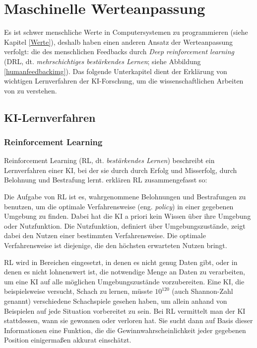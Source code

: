 \chapter{Maschinelle Werteanpassung}

Es ist schwer menschliche Werte in Computersystemen zu programmieren (siehe Kapitel \ref{Werte}), deshalb haben \citeauthor{irving_ai_2018} einen anderen Ansatz der Werteanpassung verfolgt: die des menschlichen Feedbacks durch \emph{Deep reinforcement learning} (DRL, dt. \emph{mehrschichtiges bestärkendes Lernen}; siehe Abbildung \ref{humanfeedbackimg}). Das folgende Unterkapitel dient der Erklärung von wichtigen Lernverfahren der KI-Forschung, um die wissenschaftlichen Arbeiten von \citeauthor{irving_ai_2018} zu verstehen.

\section{KI-Lernverfahren}
\subsection{Reinforcement Learning}
Reinforcement Learning (RL, dt. \emph{bestärkendes Lernen}) beschreibt ein Lernverfahren einer KI, bei der sie durch durch Erfolg und Misserfolg, durch Belohnung und Bestrafung lernt. \citeauthor{russell_artificial_2016} erklären RL zusammengefasst so: 

Die Aufgabe von RL ist es, wahrgenommene Belohnungen und Bestrafungen zu benutzen, um die optimale Verfahrensweise (eng. \emph{policy}) in einer gegebenen Umgebung zu finden. Dabei hat die KI a priori kein Wissen über ihre Umgebung oder Nutzfunktion. Die Nutzfunktion, definiert über Umgebungszustände, zeigt dabei den Nutzen einer bestimmten Verfahrensweise. Die optimale Verfahrensweise ist diejenige, die den höchsten erwarteten Nutzen bringt.

RL wird in Bereichen eingesetzt, in denen es nicht genug Daten gibt, oder in denen es nicht lohnenswert ist, die notwendige Menge an Daten zu verarbeiten, um eine KI auf alle möglichen Umgebungszustände vorzubereiten. Eine KI, die beispielsweise versucht, Schach zu lernen, müsste $10^{120}$ (auch Shannon-Zahl genannt) verschiedene Schachspiele gesehen haben, um allein anhand von Beispielen auf jede Situation vorbereitet zu sein.  Bei RL vermittelt man der KI stattdessen, wann sie gewonnen oder verloren hat. Sie sucht dann auf Basis dieser Informationen eine Funktion, die die Gewinnwahrscheinlichkeit jeder gegebenen Position einigermaßen akkurat einschätzt.

